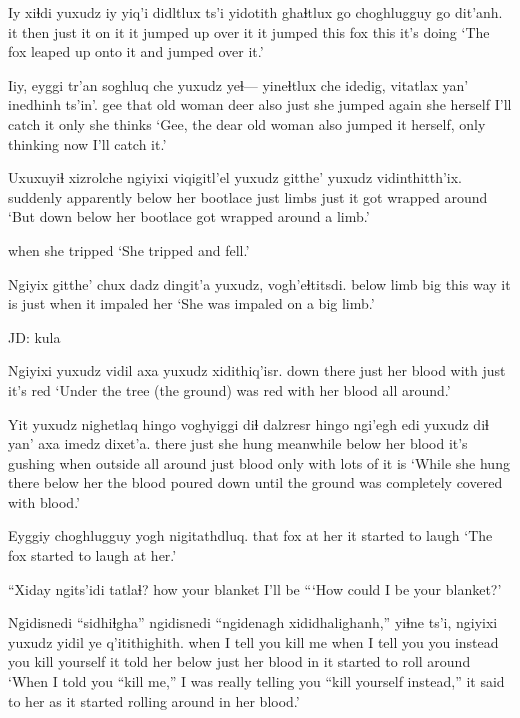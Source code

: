 \documentclass[12pt]{article}
\begin{document}
\gll Iy xiɬdi yuxudz iy yiq'i didltlux ts'i yidotith ghaɬtlux go choghlugguy go dit'anh.
it then just it {on it} {it jumped up} {} {over it} {it jumped} this fox this {it's doing}
\glt `The fox leaped up onto it and jumped over it.'
\glend

\gll Iiy, eyggi tr'an soghluq che yuxudz yeɬ--- yineɬtlux che idedig, vitatlax yan' inedhinh ts'in'. 
gee that {old woman} deer also just {} {she jumped} again {she herself} {I'll catch it} only {she thinks} {}
\glt `Gee, the dear old woman also jumped it herself, only thinking now I'll catch it.'
\glend

\gll Uxuxuyiɬ xizrolche ngiyixi viqigitl'el yuxudz gitthe' yuxudz vidinthitth'ix.
suddenly apparently below {her bootlace} just {limbs} just {it got wrapped around}
\glt `But down below her bootlace got wrapped around a limb.'
\glend

{{when she tripped}}
\glt `She tripped and fell.'
\glend

\gll Ngiyix gitthe' chux dadz dingit'a yuxudz, vogh'eɬtitsdi.
below limb big {this way} {it is} just {when it impaled her}
\glt `She was impaled on a big limb.'
\glend

JD:  kula

\gll Ngiyixi yuxudz vidil axa yuxudz xidithiq'isr.
{down there} just {her blood} with just {it's red}
\glt `Under the tree (the ground) was red with her blood all around.'
\glend

\gll Yit yuxudz nighetlaq hingo voghyiggi diɬ dalzresr hingo ngi'egh edi yuxudz diɬ yan' axa imedz dixet'a.
there just {she hung} meanwhile {below her} blood {it's gushing} when outside {all around} just blood only with {lots of} {it is}
\glt `While she hung there below her the blood poured down until the ground was completely covered with blood.'
\glend

\gll Eyggiy choghlugguy yogh nigitathdluq.
that fox {at her} {it started to laugh}
\glt `The fox started to laugh at her.'
\glend

\gll ``Xiday ngits'idi tatlaɬ?
how {your blanket} {I'll be}
\glt ```How could I be your blanket?'
\glend

\gll Ngidisnedi ``sidhiɬgha'' ngidisnedi ``ngidenagh xididhalighanh,'' yiɬne ts'i, ngiyixi yuxudz yidil ye q'itithighith. 
{when I tell you} {kill me} {when I tell you} {you instead} {you kill yourself} {it told her} {} below just {her blood} in {it started to roll around}
\glt `When I told you ``kill me,'' I was really telling you ``kill yourself instead,'' it said to her as it started rolling around in her blood.'
\glend
\end{document}
